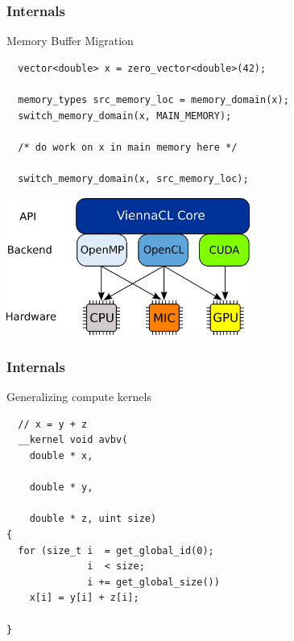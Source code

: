 \begin{frame}[fragile]
\frametitle{Internals}

 \begin{block}{Memory Buffer Migration}
  \begin{lstlisting}
  vector<double> x = zero_vector<double>(42);

  memory_types src_memory_loc = memory_domain(x);
  switch_memory_domain(x, MAIN_MEMORY);

  /* do work on x in main memory here */

  switch_memory_domain(x, src_memory_loc);
\end{lstlisting}

  \begin{center}
    \includegraphics[width=0.6\textwidth]{figures/ViennaCL-arch.png}
  \end{center}
 \end{block}

\end{frame}




\begin{frame}[fragile]
\frametitle{Internals}

 \begin{block}{Generalizing compute kernels}
  \begin{lstlisting}
  // x = y + z
  __kernel void avbv(
    double * x,

    double * y,

    double * z, uint size)
{
  for (size_t i  = get_global_id(0);
              i  < size;
              i += get_global_size())
    x[i] = y[i] + z[i]; 

}
  \end{lstlisting}
 \end{block}

 \vspace*{1.5cm}
\end{frame}



